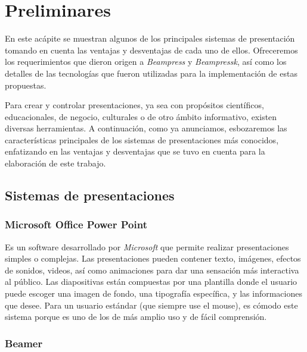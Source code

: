 \chapter{Preliminares} %
\label{cha:preliminares}

	En este acápite se muestran algunos de los principales sistemas de presentación tomando en cuenta las ventajas y desventajas de cada uno de ellos. Ofreceremos los requerimientos que dieron origen a \textit{Beampress} y \textit{Beampressk}, así como los detalles de las tecnologías que fueron utilizadas para la implementación de estas propuestas.

	Para crear y controlar presentaciones, ya sea con propósitos científicos, educacionales, de negocio, culturales o de otro ámbito informativo, existen diversas herramientas. A continuación, como ya anunciamos, esbozaremos las características principales de los sistemas de presentaciones más conocidos, enfatizando en las ventajas y desventajas que se tuvo en cuenta para la elaboración de este trabajo.	

	\section{Sistemas de presentaciones} %
	\label{sec:sistemas_de_presentaciones}
		\subsection{Microsoft Office Power Point} %
		\label{sub:microsoft_office_power_point}

			Es un software desarrollado por \textit{Microsoft}  que permite realizar presentaciones simples o complejas. Las presentaciones pueden contener texto, imágenes, efectos de sonidos, videos, así como animaciones para dar una sensación más interactiva al público. Las diapositivas están compuestas por una plantilla donde el usuario puede escoger una imagen de fondo, una tipografía específica, y las informaciones que desee. Para un usuario estándar (que siempre use el mouse), es cómodo este sistema porque es uno de los de más amplio uso y de fácil comprensión. 


		\subsection{Beamer} %
		\label{sub:beamer}


